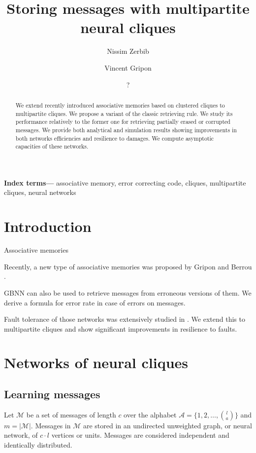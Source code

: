 \documentclass[english,11pt,twocolumn]{article}
\title{Storing messages with multipartite neural cliques}
\author[]{Nissim Zerbib}
\affil{Département d'Informatique, École normale supérieure, Paris, France}
\author[]{Vincent Gripon}
\affil{Département d'Électronique, Télécom Bretagne, Brest, France}
\author{?}
\date{
	}
\theoremstyle{definition}
\providecommand{\keywords}[1]{\textbf{Index terms---} #1}
\begin{document}
	\maketitle

	 \begin{abstract}
	 	We extend recently introduced associative memories based on clustered cliques to multipartite cliques. We propose a variant of the classic retrieving rule. We study its performance relatively to the former one for retrieving partially erased or corrupted messages. We provide both analytical and simulation results showing improvements in both networks efficiencies and resilience to damages. We compute asymptotic capacities of these networks.
	 \end{abstract}
	 
	\keywords{associative memory, error correcting code, cliques, multipartite cliques, neural networks}
	
	\section{Introduction}
	
		
		Associative memories
		
		Recently, a new type of associative memories was proposed by Gripon and Berrou \cite{GriBer20117}.
		
		GBNN can also be used to retrieve messages from erroneous versions of them. We derive a formula for error rate in case of errors on messages.
		
		Fault tolerance of those networks was extensively studied in \cite{LedGriRabGro20145}. We extend this to multipartite cliques and show significant improvements in resilience to faults.
	
	
	\section{Networks of neural cliques}
		
	\subsection{Learning messages}
		
	Let $\mathcal{M}$ be a set of messages of length $c$ over the alphabet $\mathcal{A} = \{1, 2, \hdots, {l \choose a}\}$ and $m = | \mathcal{M} |$. Messages in $\mathcal{M}$ are stored in an undirected unweighted graph, or neural network, of $c \cdot l$ vertices or units. Messages are considered independent and identically distributed.
	
\end{document}

